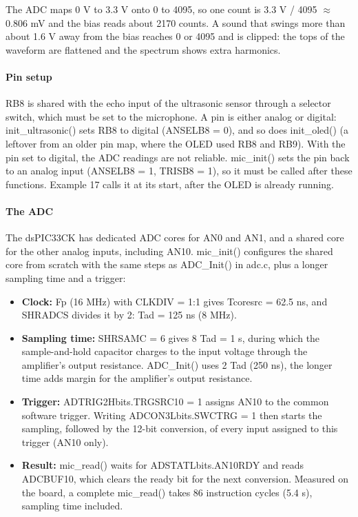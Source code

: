 \documentclass[
  11pt,
  letterpaper,
  oneside,
  DIV=13,               %
  parskip=half,          %
  headings=normal,
  chapterprefix=false,
  toc=listof,
  numbers=noenddot,
]{scrbook}
\begin{document}
The ADC maps 0 V to 3.3 V onto 0 to 4095, so one count is 3.3 V / 4095 $\approx$ 0.806 mV and the bias reads about 2170 counts. A sound that swings more than about 1.6 V away from the bias reaches 0 or 4095 and is clipped: the tops of the waveform are flattened and the spectrum shows extra harmonics.

\paragraph{Pin setup}

RB8 is shared with the echo input of the ultrasonic sensor through a selector switch, which must be set to the microphone. A pin is either analog or digital: init\_ultrasonic() sets RB8 to digital (ANSELB8 = 0), and so does init\_oled() (a leftover from an older pin map, where the OLED used RB8 and RB9). With the pin set to digital, the ADC readings are not reliable. mic\_init() sets the pin back to an analog input (ANSELB8 = 1, TRISB8 = 1), so it must be called after these functions. Example 17 calls it at its start, after the OLED is already running.

\paragraph{The ADC}

The dsPIC33CK has dedicated ADC cores for AN0 and AN1, and a shared core for the other analog inputs, including AN10. mic\_init() configures the shared core from scratch with the same steps as ADC\_Init() in adc.c, plus a longer sampling time and a trigger:
\begin{itemize}
\item \textbf{Clock: }Fp (16 MHz) with CLKDIV = 1:1 gives Tcoresrc = 62.5 ns, and SHRADCS divides it by 2: Tad = 125 ns (8 MHz).
\item \textbf{Sampling time: }SHRSAMC = 6 gives 8 Tad = 1 \textmu{}s, during which the sample-and-hold capacitor charges to the input voltage through the amplifier's output resistance. ADC\_Init() uses 2 Tad (250 ns), the longer time adds margin for the amplifier's output resistance.
\item \textbf{Trigger: }ADTRIG2Hbits.TRGSRC10 = 1 assigns AN10 to the common software trigger. Writing ADCON3Lbits.SWCTRG = 1 then starts the sampling, followed by the 12-bit conversion, of every input assigned to this trigger (AN10 only).
\item \textbf{Result: }mic\_read() waits for ADSTATLbits.AN10RDY and reads ADCBUF10, which clears the ready bit for the next conversion. Measured on the board, a complete mic\_read() takes 86 instruction cycles (5.4 \textmu{}s), sampling time included.
\end{itemize}
\end{document}
